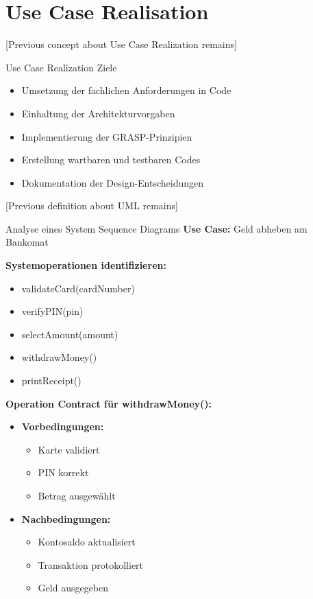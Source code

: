 \section{Use Case Realisation}

[Previous concept about Use Case Realization remains]

\begin{theorem}{Use Case Realization Ziele}
\begin{itemize}
    \item Umsetzung der fachlichen Anforderungen in Code
    \item Einhaltung der Architekturvorgaben
    \item Implementierung der GRASP-Prinzipien
    \item Erstellung wartbaren und testbaren Codes
    \item Dokumentation der Design-Entscheidungen
\end{itemize}
\end{theorem}

[Previous definition about UML remains]

\begin{example}{Analyse eines System Sequence Diagrams}
\textbf{Use Case:} Geld abheben am Bankomat

\textbf{Systemoperationen identifizieren:}
\begin{itemize}
    \item validateCard(cardNumber)
    \item verifyPIN(pin)
    \item selectAmount(amount)
    \item withdrawMoney()
    \item printReceipt()
\end{itemize}

\textbf{Operation Contract für withdrawMoney():}
\begin{itemize}
    \item \textbf{Vorbedingungen:}
    \begin{itemize}
        \item Karte validiert
        \item PIN korrekt
        \item Betrag ausgewählt
    \end{itemize}
    \item \textbf{Nachbedingungen:}
    \begin{itemize}
        \item Kontosaldo aktualisiert
        \item Transaktion protokolliert
        \item Geld ausgegeben
    \end{itemize}
\end{itemize}
\end{example}

